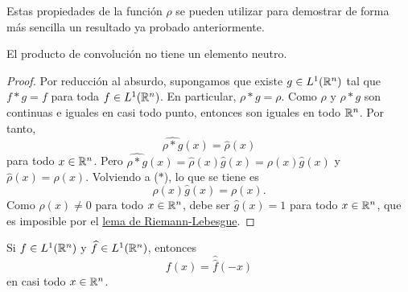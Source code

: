 \documentclass[a4paper, 11pt, oneside]{report}
\begin{document}
Estas propiedades de la función $\rho$ se pueden utilizar para demostrar de forma más sencilla un resultado ya probado anteriormente.

\begin{proposition}
  El producto de convolución no tiene un elemento neutro.
\end{proposition}

\begin{proof}
  Por reducción al absurdo, supongamos que existe $g \in L^1(\mathbb R^n)$ tal que $f \ast g = f$ para toda $f \in L^1(\mathbb R^n)$. En particular, $\rho \ast g = \rho$. Como $\rho$ y $\rho \ast g$ son continuas e iguales en casi todo punto, entonces son iguales en todo $\mathbb R^n$. Por tanto, 
  \[\widehat{\rho \ast g}(x) = \widehat{\rho}(x) \tag{$\ast$}\] para todo $x \in \mathbb R^n$. Pero $\widehat{\rho \ast g}(x) = \widehat{\rho}(x) \widehat{g}(x) = \rho(x)\widehat{g}(x)$ y $\widehat{\rho}(x) = \rho(x)$. Volviendo a ($\ast$), lo que se tiene es
  \[\rho(x)\widehat{g}(x) = \rho(x).\]
  Como $\rho(x) \neq 0$ para todo $x \in \mathbb R^n$, debe ser $\widehat{g}(x) = 1$ para todo $x \in \mathbb R^n$, que es imposible por el \hyperref[teo:3.1.11]{\color{c1}lema de Riemann-Lebesgue}.
\end{proof}

\begin{theorem}\label{teo:3.2.3}
  Si $f \in L^1(\mathbb R^n)$ y $\widehat{f} \in L^1(\mathbb R^n)$, entonces
  \[f(x) = \hat{\hat{f}}(-x)\]
  en casi todo $x \in \mathbb R^n$.
\end{theorem}
\end{document}
